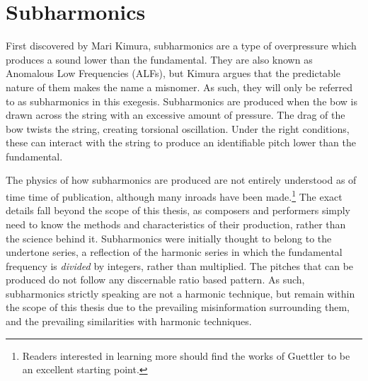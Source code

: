 
\newpage
\section{Subharmonics} \label{sec:subharmonicsDiscussion}
First discovered by Mari Kimura, subharmonics are a type of overpressure which produces a sound lower than the fundamental.\autocite{kimuraHowProduceSubharmonics1999} 
They are also known as Anomalous Low Frequencies (ALFs), but Kimura argues that the predictable nature of them makes the name a misnomer.\autocite[]{kimuraHowProduceSubharmonics1999}
As such, they will only be referred to as subharmonics in this exegesis.
Subharmonics are produced when the bow is drawn across the string with an excessive amount of pressure.
The drag of the bow twists the string, creating torsional oscillation. 
Under the right conditions, these can interact with the string to produce an identifiable pitch lower than the fundamental.\autocite{Subharmonics2006}

The physics of how subharmonics are produced are not entirely understood as of time time of publication, although many inroads have been made.\footnote{Readers interested in learning more should find the works of Guettler to be an excellent starting point.}\autocite[]{guettlerBowedStringDevelopment2002}
The exact details fall beyond the scope of this thesis, as composers and performers simply need to know the methods and characteristics of their production, rather than the science behind it.
Subharmonics were initially thought to belong to the undertone series, a reflection of the harmonic series in which the fundamental frequency is \emph{divided} by integers, rather than multiplied.\autocite[]{shaahinmohajeriEqualdivisionsoflengthEdl240edo2019}
The pitches that can be produced do not follow any discernable ratio based pattern.\autocite[]{guettlerWaveAnalysisString1994}
As such, subharmonics strictly speaking are not a harmonic technique, but remain within the scope of this thesis due to the prevailing misinformation surrounding them, and the prevailing similarities with harmonic techniques.

